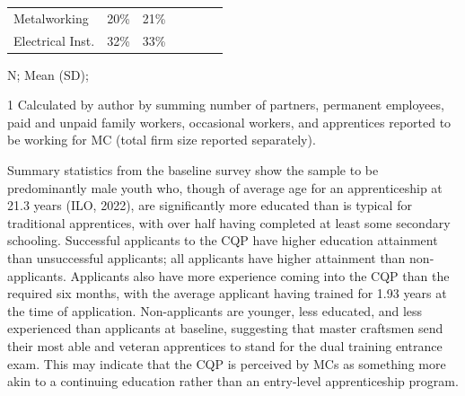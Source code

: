 \documentclass[
  11pt,
a4paper
]{report}
\begin{document}
\begin{table}[H]
\begin{threeparttable}
{\begin{tabular}[t]{lcccccc}
\hspace{1em}\hspace{1em}Metalworking & 20\% & 21\% &  &  &  & \\
\hspace{1em}\hspace{1em}Electrical Inst. & 32\% & 33\% &  &  &  & \\
\bottomrule
\end{tabular}}
\begin{tablenotes}
\small
\item N; Mean (SD); %
\item[1] Calculated by author by summing number of partners, permanent employees, paid and unpaid family workers, occasional workers, and apprentices reported to be working for MC (total firm size reported separately).
\end{tablenotes}
\end{threeparttable}
\end{table}
\doublespacing

\noindent Summary statistics from the baseline survey show the sample to be predominantly male youth who, though of average age for an apprenticeship at 21.3 years (ILO, 2022), are significantly more educated than is typical for traditional apprentices, with over half having completed at least some secondary schooling. Successful applicants to the CQP have higher education attainment than unsuccessful applicants; all applicants have higher attainment than non-applicants. Applicants also have more experience coming into the CQP than the required six months, with the average applicant having trained for 1.93 years at the time of application. Non-applicants are younger, less educated, and less experienced than applicants at baseline, suggesting that master craftsmen send their most able and veteran apprentices to stand for the dual training entrance exam. This may indicate that the CQP is perceived by MCs as something more akin to a continuing education rather than an entry-level apprenticeship program.
\end{document}
